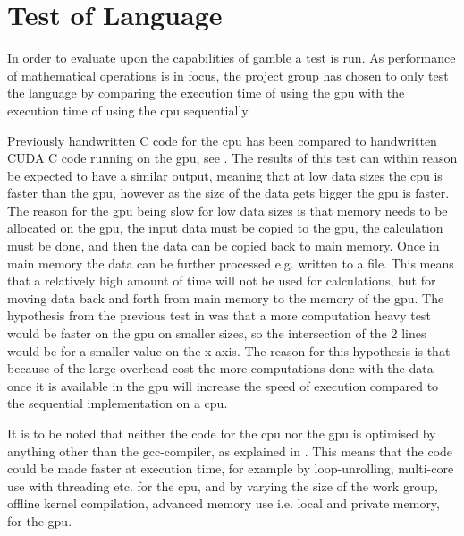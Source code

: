 \chapter{Test of Language} %
\label{cha:test_of_language}
In order to evaluate upon the capabilities of \gls{gamble} a test is run. 
As performance of mathematical operations is in focus, the project group has chosen to only test the language by comparing the execution time of using the \acrshort{gpu} with the execution time of using the \acrshort{cpu} sequentially.

Previously handwritten C code for the \acrshort{cpu} has been compared to handwritten CUDA C code running on the \acrshort{gpu}, see .
The results of this test can within reason be expected to have a similar output, meaning that at low data sizes the \acrshort{cpu} is faster than the \acrshort{gpu}, however as the size of the data gets bigger the \acrshort{gpu} is faster.
The reason for the \acrshort{gpu} being slow for low data sizes is that memory needs to be allocated on the \acrshort{gpu}, the input data must be copied to the \acrshort{gpu}, the calculation must be done, and then the data can be copied back to main memory. 
Once in main memory the data can be further processed e.g. written to a file. 
This means that a relatively high amount of time will not be used for calculations, but for moving data back and forth from main memory to the memory of the \acrshort{gpu}.
The hypothesis from the previous test in  was that a more computation heavy test would be faster on the \acrshort{gpu} on smaller sizes, so the intersection of the 2 lines would be for a smaller value on the x-axis. 
The reason for this hypothesis is that because of the large overhead cost the more computations done with the data once it is available in the \acrshort{gpu} will increase the speed of execution compared to the sequential implementation on a \acrshort{cpu}.

It is to be noted that neither the code for the \acrshort{cpu} nor the \acrshort{gpu} is optimised by anything other than the gcc-compiler, as explained in . 
This means that the code could be made faster at execution time, for example by loop-unrolling, multi-core use with threading etc. for the \acrshort{cpu}, and by varying the size of the work group, offline kernel compilation, advanced memory use i.e. local and private memory, for the \acrshort{gpu}.  

